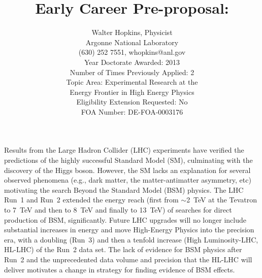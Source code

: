 \documentclass[letter, USenglish, 11pt, subfigure]{article}
\title{Early Career Pre-proposal: \\}
\author{Walter Hopkins, Physicist\\Argonne National Laboratory\\(630) 252 7551, whopkins@anl.gov\\Year Doctorate Awarded: 2013\\Number of Times Previously Applied: 2\\ Topic Area: Experimental Research at the \\Energy Frontier in High Energy Physics\\Eligibility Extension Requested: No\\
  FOA Number: DE-FOA-0003176
}
\date{}
\begin{document}
\maketitle







Results from the Large Hadron Collider (LHC) experiments have verified the predictions of the highly successful Standard Model (SM), culminating with the discovery of the Higgs boson. However, the SM  lacks an explanation for several observed phenomena (e.g., dark matter, the matter-antimatter asymmetry, etc) motivating the search Beyond the Standard Model (BSM) physics. The LHC Run~1 and Run~2 extended the energy reach (first from $\sim$2~TeV at the Tevatron to 7~TeV and then to 8~TeV and finally to 13~TeV) of searches for direct production of BSM, significantly. Future LHC upgrades will no longer include substantial increases in energy and move High-Energy Physics into the precision era, with a doubling (Run~3) and then a tenfold increase (High Luminosity-LHC, HL-LHC) of the Run~2 data set. The lack of evidence for BSM physics after Run~2 and the unprecedented data volume and precision that the HL-LHC will deliver motivates a change in strategy for finding evidence of BSM effects.
\end{document}
